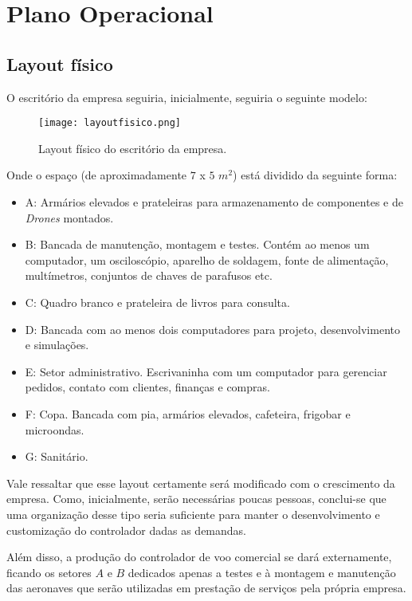 \section{Plano Operacional}

\subsection{Layout físico}

O escritório da empresa seguiria, inicialmente, seguiria o seguinte
modelo:

\begin{figure}[H]
\centering
\texttt{[image: layoutfisico.png]}
\caption{Layout físico do escritório da empresa.}
\label{fig:layoutfisico}
\end{figure}

Onde o espaço (de aproximadamente $7$ x $5$ $m^2$) está dividido
da seguinte forma:

\begin{itemize}
	\item A: Armários elevados e prateleiras para armazenamento de 
	componentes e de \emph{Drones} montados.
	\item B: Bancada de manutenção, montagem e testes. Contém ao 
	menos um computador, um osciloscópio, aparelho de soldagem, 
	fonte de alimentação, multímetros, conjuntos de chaves de 
	parafusos etc.
	\item C: Quadro branco e prateleira de livros para consulta.
	\item D: Bancada com ao menos dois computadores para projeto,
	desenvolvimento e simulações.
	\item E: Setor administrativo. Escrivaninha com um computador
	para gerenciar pedidos, contato com clientes, finanças e 
	compras.
	\item F: Copa. Bancada com pia, armários elevados, cafeteira,
	frigobar e microondas.
	\item G: Sanitário.
\end{itemize}

Vale ressaltar que esse layout certamente será modificado com 
o crescimento da empresa. Como, inicialmente, serão necessárias
poucas pessoas, conclui-se que uma organização desse tipo seria
suficiente para manter o desenvolvimento e customização do 
controlador dadas as demandas.


Além disso, a produção do controlador de voo comercial se dará 
externamente, ficando os setores $A$ e $B$ dedicados apenas a 
testes e à montagem e manutenção das aeronaves que serão utilizadas 
em prestação de serviços pela própria empresa.

